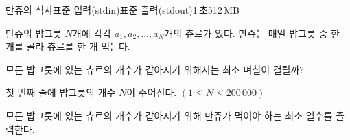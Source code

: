 \begin{problem}{만쥬의 식사}{표준 입력(stdin)}{표준 출력(stdout)}{1\,초}{512\,MB}

만쥬의 밥그릇 $N$개에 각각 $a_1, a_2, \dots, a_N$개의 츄르가 있다. 만쥬는 매일 밥그릇 중 한 개를 골라 츄르를 한 개 먹는다. 

모든 밥그릇에 있는 츄르의 개수가 같아지기 위해서는 최소 며칠이 걸릴까?

\InputFile
첫 번째 줄에 밥그릇의 개수 $ N $이 주어진다. $(1\le N \le 200\,000)$


\OutputFile
모든 밥그릇에 있는 츄르의 개수가 같아지기 위해 만쥬가 먹어야 하는 최소 일수를 출력한다.

\Examples

\begin{example}
%
%
\end{example}

\end{problem}
